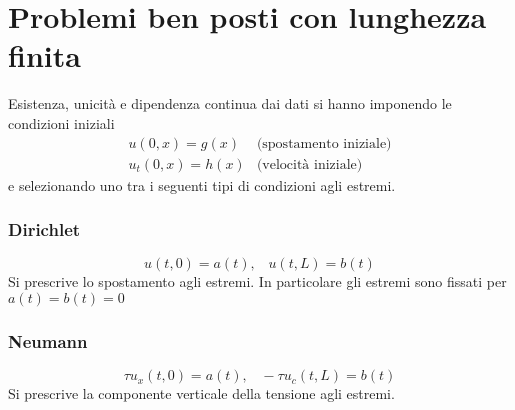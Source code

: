 \section{Problemi ben posti con lunghezza finita}
Esistenza, unicit\`a e dipendenza continua dai dati si hanno imponendo le
condizioni iniziali
\[
\begin{array}{ll}
	u(0,x)=g(x) & \text{(spostamento iniziale)}\\
	u_t(0,x)=h(x) & \text{(velocit\`a iniziale)}
\end{array}
\]
e selezionando uno tra i seguenti tipi di condizioni agli estremi.
\subsubsection{Dirichlet}
\[
	u(t,0)=a(t), \;\;\; u(t,L)=b(t)
\]
Si prescrive lo spostamento agli estremi.
In particolare gli estremi sono fissati per $a(t)= b(t)=0$
\subsubsection{Neumann}
\[
	\tau u_x(t,0)=a(t), \;\;\; -\tau u_c (t,L)=b(t)
\]
Si prescrive la componente verticale della tensione agli estremi.
